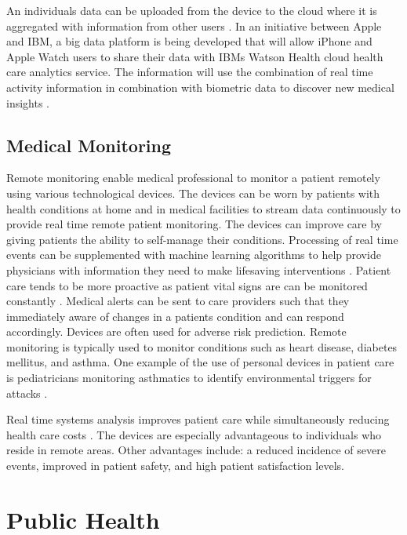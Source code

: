 \documentclass[sigconf]{acmart}
\begin{document}
An individuals data can be uploaded from the device to the cloud where it is aggregated with information from other users \cite{www-google-HlthCat}.  In an initiative between Apple and IBM,  a big data platform is being developed that will allow iPhone and Apple Watch users to share their data with IBMs Watson Health cloud health care analytics service. The information will use the combination of real time activity information in combination with biometric data to discover new medical insights \cite{www-google-forbes042015}. 

\subsection{Medical Monitoring} 

Remote monitoring enable medical professional to monitor a patient remotely using various technological devices.  The devices can be worn by patients with health conditions at home and in medical facilities to stream data continuously to provide real time remote patient monitoring.  The devices can improve care by giving patients the ability to self-manage their conditions.  Processing of real time events can be supplemented with machine learning algorithms to help provide physicians with information they need to make lifesaving interventions \cite{www-google-McDonald}.  Patient care tends to be more proactive as patient vital signs are can be monitored constantly \cite{www-google-McDonald}. Medical alerts can be sent to care providers such that they immediately aware of changes in a patients condition and can respond accordingly.  Devices are often used for adverse risk prediction. Remote monitoring is typically used to monitor conditions such as heart disease, diabetes mellitus, and asthma.  One example of the use of personal devices in patient care is pediatricians monitoring asthmatics to identify environmental triggers for attacks \cite{www-google-CIO}. 

Real time systems analysis improves patient care while simultaneously reducing health care costs \cite{www-google-christian}.  The devices are especially advantageous to individuals who reside in remote areas. Other advantages include: a reduced incidence of severe events, improved in patient safety, and high patient satisfaction levels.
 

\section{Public Health}
\end{document}
